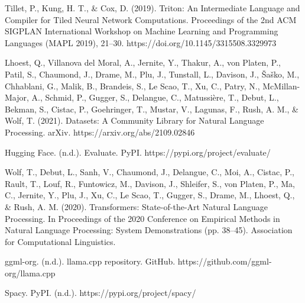 \documentclass[licencjacka,en]{pracamgr}
\begin{document}
\begin{thebibliography}{99}
Tillet, P., Kung, H. T., \& Cox, D. (2019). Triton: An Intermediate Language and Compiler for Tiled Neural Network Computations. Proceedings of the 2nd ACM SIGPLAN International Workshop on Machine Learning and Programming Languages (MAPL 2019), 21–30. https://doi.org/10.1145/3315508.3329973

Lhoest, Q., Villanova del Moral, A., Jernite, Y., Thakur, A., von Platen, P., Patil, S., Chaumond, J., Drame, M., Plu, J., Tunstall, L., Davison, J., Šaško, M., Chhablani, G., Malik, B., Brandeis, S., Le Scao, T., Xu, C., Patry, N., McMillan-Major, A., Schmid, P., Gugger, S., Delangue, C., Matussière, T., Debut, L., Bekman, S., Cistac, P., Goehringer, T., Mustar, V., Lagunas, F., Rush, A. M., \& Wolf, T. (2021). Datasets: A Community Library for Natural Language Processing. arXiv. https://arxiv.org/abs/2109.02846

Hugging Face. (n.d.). Evaluate. PyPI. https://pypi.org/project/evaluate/

Wolf, T., Debut, L., Sanh, V., Chaumond, J., Delangue, C., Moi, A., Cistac, P., Rault, T., Louf, R., Funtowicz, M., Davison, J., Shleifer, S., von Platen, P., Ma, C., Jernite, Y., Plu, J., Xu, C., Le Scao, T., Gugger, S., Drame, M., Lhoest, Q., \& Rush, A. M. (2020). Transformers: State-of-the-Art Natural Language Processing. In Proceedings of the 2020 Conference on Empirical Methods in Natural Language Processing: System Demonstrations (pp. 38–45). Association for Computational Linguistics.

ggml-org. (n.d.). llama.cpp repository. GitHub. https://github.com/ggml-org/llama.cpp


Spacy. PyPI. (n.d.). https://pypi.org/project/spacy/


\end{thebibliography}
\end{document}
